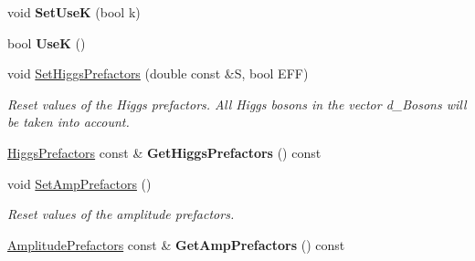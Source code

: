 \begin{DoxyCompactItemize}
\item 
\hypertarget{classHiggsModel_a0f932c9eddbc1d0f93b97135c2db468d}{}void {\bfseries Set\+Use\+K} (bool k)\label{classHiggsModel_a0f932c9eddbc1d0f93b97135c2db468d}

\item 
\hypertarget{classHiggsModel_acd450a454977065794aa76695963c8eb}{}bool {\bfseries Use\+K} ()\label{classHiggsModel_acd450a454977065794aa76695963c8eb}

\item 
void \hyperlink{classHiggsModel_a43f6951291eef31cc18116f7d49f839f}{Set\+Higgs\+Prefactors} (double const \&S, bool E\+F\+F)
\begin{DoxyCompactList}\small\item\em Reset values of the Higgs prefactors. All Higgs bosons in the vector d\+\_\+\+Bosons will be taken into account. \end{DoxyCompactList}\item 
\hypertarget{classHiggsModel_a36b052bac528028a1757554d45901513}{}\hyperlink{structHiggsPrefactors}{Higgs\+Prefactors} const \& {\bfseries Get\+Higgs\+Prefactors} () const \label{classHiggsModel_a36b052bac528028a1757554d45901513}

\item 
\hypertarget{classHiggsModel_a514e3dd7854409c622b8e200fe2ee84c}{}void \hyperlink{classHiggsModel_a514e3dd7854409c622b8e200fe2ee84c}{Set\+Amp\+Prefactors} ()\label{classHiggsModel_a514e3dd7854409c622b8e200fe2ee84c}

\begin{DoxyCompactList}\small\item\em Reset values of the amplitude prefactors. \end{DoxyCompactList}\item 
\hypertarget{classHiggsModel_a77b35a425c80b8d9006354670f91acca}{}\hyperlink{structAmplitudePrefactors}{Amplitude\+Prefactors} const \& {\bfseries Get\+Amp\+Prefactors} () const \label{classHiggsModel_a77b35a425c80b8d9006354670f91acca}


\end{DoxyCompactItemize}
